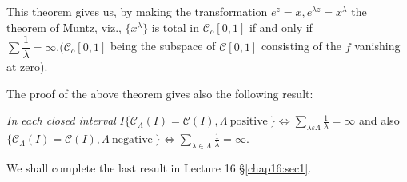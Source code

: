 This theorem gives us, by making the transformation $e^z = x,
e^{\lambda z} = x^{\lambda}$ the theorem of Muntz, viz.,
$\{x^{\lambda} \}$ is total in $\mathscr{C}_o [0,1]$ if and only if
$\sum \dfrac{1}{\lambda} = \infty. (\mathscr{C}_o [0, 1]$ being the
subspace of $\mathscr{C}[ 0,1]$ consisting of the $f$ vanishing at
zero). 

The proof of the above theorem gives also the following result:

\textit {In each closed interval} $I \{ \mathscr{C}_\Lambda (I)=
\mathscr{C}(I), \Lambda ~\text{positive}~ \} \Leftrightarrow \sum \limits
_{\lambda \varepsilon \Lambda} \frac{1}{\lambda} = \infty$ and also
$\{\mathscr{C}_{\Lambda}(I) = \mathscr{C}(I), \Lambda ~\text{negative}~ \}
\Leftrightarrow \sum \limits_{\lambda \in \Lambda}
\frac{1}{\lambda} = \infty$.

We shall complete the last result in Lecture 16 \S \ref{chap16:sec1}.
